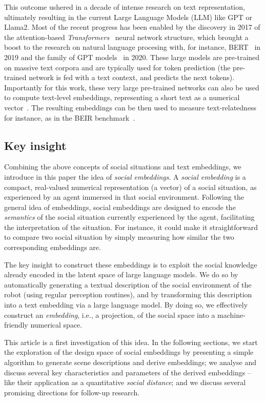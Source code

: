 This outcome ushered in a decade of intense research on text representation,
ultimately resulting in the current Large Language Models (LLM) like GPT or
Llama2.  Most of the recent progress has been enabled by the discovery in 2017
of the attention-based \emph{Transformers}~\cite{vaswani2017attention} neural
network structure, which brought a boost to the research on natural language
procesing with, for instance, BERT~\cite{devlin2019bert} in 2019 and the family
of GPT models~\cite{wolf2020transformers} in 2020.  These large models
are pre-trained on massive text corpora and are typically used for token
prediction (the pre-trained network is fed with a text context, and predicts the
next tokens).  Importantly for this work, these very large pre-trained networks
can also be used to compute text-level embeddings, representing a short text as
a numerical vector~\cite{reimers2019sentencebert,muennighoff2022sgpt}. The
resulting embeddings can be then used to measure text-relatedness for instance,
as in the BEIR benchmark~\cite{thakur2021beir}.

\subsection{Key insight}

Combining the above concepts of social situations and text embeddings, we introduce in
this paper the idea of \emph{social embeddings}. A \emph{social embedding} is a
compact, real-valued numerical representation (a vector) of a social
situation, as experienced by an agent immersed in that social environment.
Following the general idea of embeddings, social embeddings are designed
to encode the \emph{semantics} of the social situation currently experienced by
the agent, facilitating the interpretation of the situation. For instance, it
could make it straightforward to compare two social situation by simply
measuring how similar the two corresponding embeddings are.

The key insight to construct these embeddings is to exploit the social knowledge
already encoded in the latent space of large language models. We do so by
automatically generating a textual description of the social environment of the
robot (using regular perception routines), and by transforming this
description into a text embedding via a large language model. By doing so, we
effectively construct an \emph{embedding}, i.e., a projection, of the social
space into a machine-friendly numerical space.

This article is a first investigation of this idea. In the following sections,
we start the exploration of the design space of social embeddings by presenting
a simple algorithm to generate scene descriptions and derive embeddings; we
analyse and discuss several key characteristics and parameters of the derived
embeddings -- like their application as a quantitative \emph{social distance};
and we discuss several promising directions for follow-up research.


